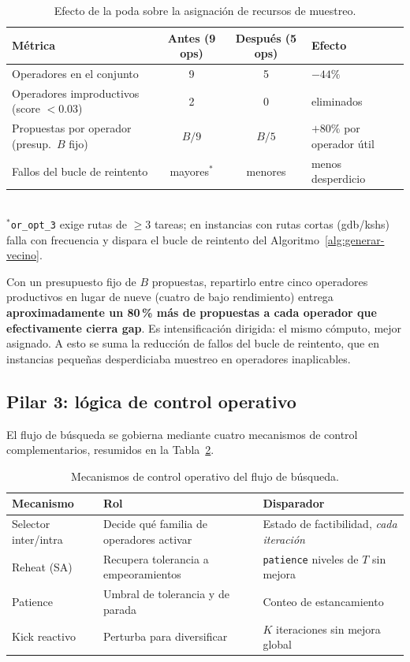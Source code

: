 \documentclass[11pt,a4paper]{article}
\theoremstyle{definition}
\theoremstyle{remark}
\begin{document}
\begin{table}[h]
\centering
\caption{Efecto de la poda sobre la asignación de recursos de muestreo.}
\label{tab:concentracion-presupuesto}
\small
\begin{tabular}{lccl}
\toprule
Métrica & Antes (9 ops) & Después (5 ops) & Efecto \\
\midrule
Operadores en el conjunto        & 9   & 5   & $-44\%$ \\
Operadores improductivos (score $<0.03$) & 2 & 0 & eliminados \\
Propuestas por operador (presup.\ $B$ fijo) & $B/9$ & $B/5$ & $+80\%$ por operador útil \\
Fallos del bucle de reintento    & mayores$^*$ & menores & menos desperdicio \\
\bottomrule
\end{tabular}
\\[4pt]
\footnotesize $^*$\texttt{or\_opt\_3} exige rutas de $\geq 3$ tareas; en
instancias con rutas cortas (gdb/kshs) falla con frecuencia y dispara el
bucle de reintento del Algoritmo~\ref{alg:generar-vecino}.
\end{table}

Con un presupuesto fijo de $B$ propuestas, repartirlo entre cinco
operadores productivos en lugar de nueve (cuatro de bajo rendimiento)
entrega \textbf{aproximadamente un 80\,\% más de propuestas a cada operador
que efectivamente cierra gap}. Es intensificación dirigida: el mismo
cómputo, mejor asignado. A esto se suma la reducción de fallos del bucle de
reintento, que en instancias pequeñas desperdiciaba muestreo en operadores
inaplicables.

\subsection{Pilar 3: lógica de control operativo}
\label{subsec:pilar-control}

El flujo de búsqueda se gobierna mediante cuatro mecanismos de control
complementarios, resumidos en la Tabla~\ref{tab:mecanismos-control}.

\begin{table}[h]
\centering
\caption{Mecanismos de control operativo del flujo de búsqueda.}
\label{tab:mecanismos-control}
\small
\begin{tabular}{lp{4.3cm}p{4.6cm}}
\toprule
Mecanismo & Rol & Disparador \\
\midrule
Selector inter/intra & Decide qué familia de operadores activar & Estado de factibilidad, \emph{cada iteración} \\
Reheat (SA) & Recupera tolerancia a empeoramientos & \texttt{patience} niveles de $T$ sin mejora \\
Patience & Umbral de tolerancia y de parada & Conteo de estancamiento \\
Kick reactivo & Perturba para diversificar & $K$ iteraciones sin mejora global \\
\bottomrule
\end{tabular}
\end{table}
\end{document}
